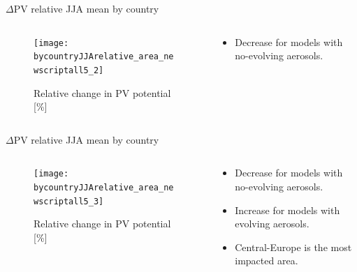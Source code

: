 \documentclass{beamer}%
\begin{document}

\begin{frame}[fragile]{$\Delta$PV relative JJA mean by country}
  \vspace{0.5\baselineskip}
  \begin{columns}
    \begin{column}{0.6\textwidth}
  \begin{figure}
       \centering\texttt{[image: bycountryJJArelative\_area\_newscriptall5\_2]}
       \centering\caption{Relative change in PV potential [\%]}
     \end{figure}
   \end{column}
   \begin{column}{0.4\textwidth}
     \begin{itemize}
     \item Decrease for models with no-evolving aerosols.
     \end{itemize}
     \end{column}
     \end{columns}
\end{frame}

\begin{frame}[fragile]{$\Delta$PV relative JJA mean by country}
  \vspace{0.5\baselineskip}
  \begin{columns}
    \begin{column}{0.6\textwidth}
  \begin{figure}
       \centering\texttt{[image: bycountryJJArelative\_area\_newscriptall5\_3]}
       \centering\caption{Relative change in PV potential [\%]}
     \end{figure}
   \end{column}
   \begin{column}{0.4\textwidth}
     \begin{itemize}
     \item Decrease for models with no-evolving aerosols.
     \item Increase for models with evolving aerosols.
     \item Central-Europe is the most impacted area.  
     \end{itemize}
     \end{column}
     \end{columns}
\end{frame}
\end{document}
